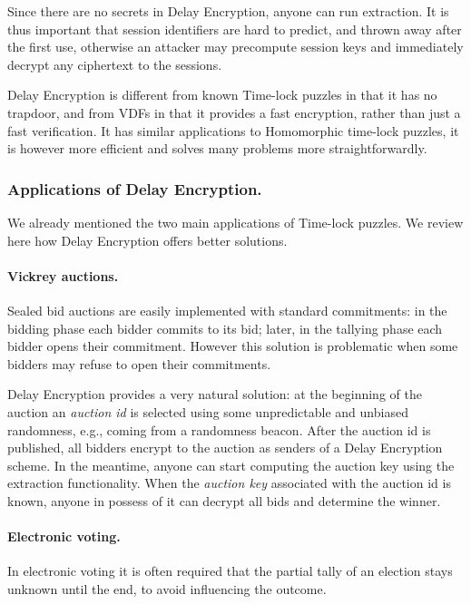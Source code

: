 \documentclass{llncs}
\begin{document}
Since there are no secrets in Delay Encryption, anyone can run
extraction. %
It is thus important that session identifiers are hard to predict, and
thrown away after the first use, otherwise an attacker may precompute
session keys and immediately decrypt any ciphertext to the sessions.

Delay Encryption is different from known Time-lock puzzles in that it
has no trapdoor, and from VDFs in that it provides a fast encryption,
rather than just a fast verification. %
It has similar applications to Homomorphic time-lock puzzles, it is
however more efficient and solves many problems more
straightforwardly.


\subsubsection{Applications of Delay Encryption.}

We already mentioned the two main applications of Time-lock puzzles. %
We review here how Delay Encryption offers better solutions.

\paragraph{Vickrey auctions.} 
Sealed bid auctions are easily implemented with standard commitments:
in the bidding phase each bidder commits to its bid; later, in the
tallying phase each bidder opens their commitment. %
However this solution is problematic when some bidders may refuse to
open their commitments.
   
Delay Encryption provides a very natural solution: at the beginning of
the auction an \emph{auction id} is selected using some unpredictable
and unbiased randomness, e.g., coming from a randomness beacon. %
After the auction id is published, all bidders encrypt to the auction
as senders of a Delay Encryption scheme. %
In the meantime, anyone can start computing the auction key using the
extraction functionality. %
When the \emph{auction key} associated with the auction id is known,
anyone in possess of it can decrypt all bids and determine the winner.

\paragraph{Electronic voting.} In electronic voting it is often
required that the partial tally of an election stays unknown until the
end, to avoid influencing the outcome. %
\end{document}
